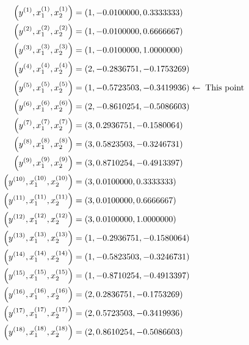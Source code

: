 \documentclass{article}
\begin{document}
\begin{align*}
\left(y^{\left(1\right)}, x_{1}^{\left(1\right)}, x_{2}^{\left(1\right)}\right) &= \left(1,-0.0100000,0.3333333\right)
\\ \left(y^{\left(2\right)}, x_{1}^{\left(2\right)}, x_{2}^{\left(2\right)}\right) &= \left(1,-0.0100000,0.6666667\right)
\\ \left(y^{\left(3\right)}, x_{1}^{\left(3\right)}, x_{2}^{\left(3\right)}\right) &= \left(1,-0.0100000,1.0000000\right)
\\ \left(y^{\left(4\right)}, x_{1}^{\left(4\right)}, x_{2}^{\left(4\right)}\right) &= \left(2,-0.2836751,-0.1753269\right)
\\ \left(y^{\left(5\right)}, x_{1}^{\left(5\right)}, x_{2}^{\left(5\right)}\right) &= \left(1,-0.5723503,-0.3419936\right) \leftarrow \text{\;This point\;}
\\ \left(y^{\left(6\right)}, x_{1}^{\left(6\right)}, x_{2}^{\left(6\right)}\right) &= \left(2,-0.8610254,-0.5086603\right)
\\ \left(y^{\left(7\right)}, x_{1}^{\left(7\right)}, x_{2}^{\left(7\right)}\right) &= \left(3,0.2936751,-0.1580064\right)
\\ \left(y^{\left(8\right)}, x_{1}^{\left(8\right)}, x_{2}^{\left(8\right)}\right) &= \left(3,0.5823503,-0.3246731\right)
\\ \left(y^{\left(9\right)}, x_{1}^{\left(9\right)}, x_{2}^{\left(9\right)}\right) &= \left(3,0.8710254,-0.4913397\right)
\\ \left(y^{\left(10\right)}, x_{1}^{\left(10\right)}, x_{2}^{\left(10\right)}\right) &= \left(3,0.0100000,0.3333333\right)
\\ \left(y^{\left(11\right)}, x_{1}^{\left(11\right)}, x_{2}^{\left(11\right)}\right) &= \left(3,0.0100000,0.6666667\right)
\\ \left(y^{\left(12\right)}, x_{1}^{\left(12\right)}, x_{2}^{\left(12\right)}\right) &= \left(3,0.0100000,1.0000000\right)
\\ \left(y^{\left(13\right)}, x_{1}^{\left(13\right)}, x_{2}^{\left(13\right)}\right) &= \left(1,-0.2936751,-0.1580064\right)
\\ \left(y^{\left(14\right)}, x_{1}^{\left(14\right)}, x_{2}^{\left(14\right)}\right) &= \left(1,-0.5823503,-0.3246731\right)
\\ \left(y^{\left(15\right)}, x_{1}^{\left(15\right)}, x_{2}^{\left(15\right)}\right) &= \left(1,-0.8710254,-0.4913397\right)
\\ \left(y^{\left(16\right)}, x_{1}^{\left(16\right)}, x_{2}^{\left(16\right)}\right) &= \left(2,0.2836751,-0.1753269\right)
\\ \left(y^{\left(17\right)}, x_{1}^{\left(17\right)}, x_{2}^{\left(17\right)}\right) &= \left(2,0.5723503,-0.3419936\right)
\\ \left(y^{\left(18\right)}, x_{1}^{\left(18\right)}, x_{2}^{\left(18\right)}\right) &= \left(2,0.8610254,-0.5086603\right)
\end{align*}
\end{document}
